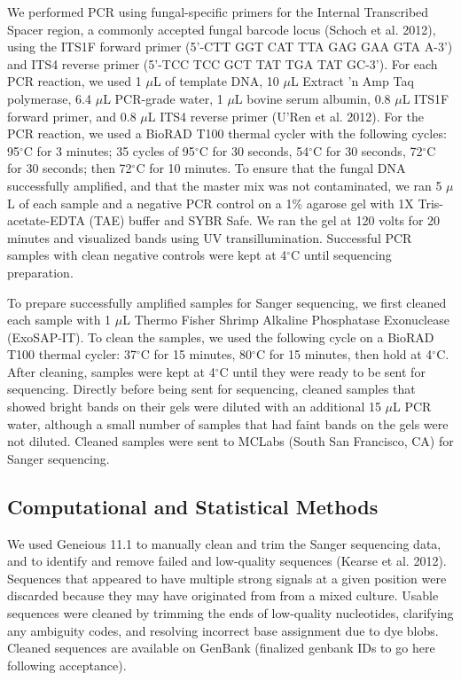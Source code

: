 \documentclass[fleqn,10pt,lineno]{wlpeerj} %
\begin{document}
We performed PCR using fungal-specific primers for the Internal Transcribed Spacer region, a commonly accepted fungal barcode locus (Schoch et al. 2012), using the ITS1F forward primer (5'-CTT GGT CAT TTA GAG GAA GTA A-3') and ITS4 reverse primer (5'-TCC TCC GCT TAT TGA TAT GC-3'). For each PCR reaction, we used 1 \(\mu\)L of template DNA, 10 \(\mu\)L Extract 'n Amp Taq polymerase, 6.4 \(\mu\)L PCR-grade water, 1 \(\mu\)L bovine serum albumin, 0.8 \(\mu\)L ITS1F forward primer, and 0.8 \(\mu\)L ITS4 reverse primer (U'Ren et al. 2012). For the PCR reaction, we used a BioRAD T100 thermal cycler with the following cycles: 95\(^{\circ}\)C for 3 minutes; 35 cycles of 95\(^{\circ}\)C for 30 seconds, 54\(^{\circ}\)C for 30 seconds, 72\(^{\circ}\)C for 30 seconds; then 72\(^{\circ}\)C for 10 minutes. To ensure that the fungal DNA successfully amplified, and that the master mix was not contaminated, we ran 5 \(\mu\)L of each sample and a negative PCR control on a 1\% agarose gel with 1X Tris-acetate-EDTA (TAE) buffer and SYBR Safe. We ran the gel at 120 volts for 20 minutes and visualized bands using UV transillumination. Successful PCR samples with clean negative controls were kept at 4\(^{\circ}\)C until sequencing preparation.

To prepare successfully amplified samples for Sanger sequencing, we first cleaned each sample with 1 \(\mu\)L Thermo Fisher Shrimp Alkaline Phosphatase Exonuclease (ExoSAP-IT). To clean the samples, we used the following cycle on a BioRAD T100 thermal cycler: 37\(^{\circ}\)C for 15 minutes, 80\(^{\circ}\)C for 15 minutes, then hold at 4\(^{\circ}\)C. After cleaning, samples were kept at 4\(^{\circ}\)C until they were ready to be sent for sequencing. Directly before being sent for sequencing, cleaned samples that showed bright bands on their gels were diluted with an additional 15 \(\mu\)L PCR water, although a small number of samples that had faint bands on the gels were not diluted. Cleaned samples were sent to MCLabs (South San Francisco, CA) for Sanger sequencing.

\hypertarget{computational-and-statistical-methods}{%
\subsection*{Computational and Statistical Methods}\label{computational-and-statistical-methods}}

We used Geneious 11.1 to manually clean and trim the Sanger sequencing data, and to identify and remove failed and low-quality sequences (Kearse et al. 2012). Sequences that appeared to have multiple strong signals at a given position were discarded because they may have originated from from a mixed culture. Usable sequences were cleaned by trimming the ends of low-quality nucleotides, clarifying any ambiguity codes, and resolving incorrect base assignment due to dye blobs. Cleaned sequences are available on GenBank (finalized genbank IDs to go here following acceptance).
\end{document}
